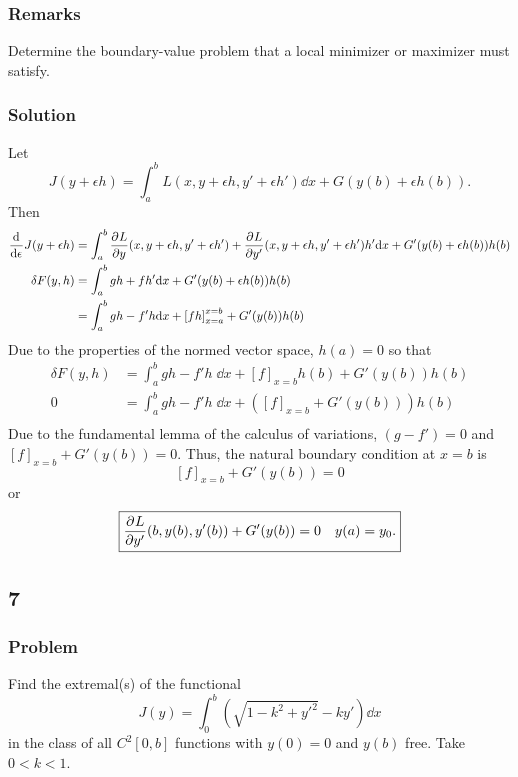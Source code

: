 \documentclass[12pt,twoside]{article}
\begin{document}
\subsubsection*{Remarks}
Determine the boundary-value problem that a local minimizer or maximizer must
satisfy.
\subsubsection*{Solution}
Let
\begin{equation*}
  J(y+\epsilon h) = \int_a^b L(x,y+\epsilon h, y'+\epsilon h')\dd{x} + G(y(b) + \epsilon h(b)).
\end{equation*}
Then
\begin{align*}
  \frac{\mathrm{d}^{} {}}{\mathrm{d}{\epsilon}^{}} J(y+\epsilon h) &= \int_a^b\frac{\partial^{} {L}}{\partial {y}^{}}(x,y+\epsilon h, y'+\epsilon h') +
                                    \frac{\partial^{} {L}}{\partial {y'}^{}}(x,y+\epsilon h, y'+\epsilon h')h'\mathrm{d}{x} +
                                    G'(y(b)+\epsilon h(b))h(b) \\
  \delta F(y,h) &= \int_a^b g h + f h'\mathrm{d}{x} + G'(y(b)+\epsilon h(b))h(b) \\
  &= \int_a^b gh - f'h\mathrm{d}{x} + {[fh]}_{x=a}^{x=b} + G'(y(b))h(b) \\
\end{align*}
Due to the properties of the normed vector space, $h(a)=0$ so that
\begin{align*}
  \delta F(y,h) &= \int_a^b gh - f'h\;\dd{x} + {[f]}_{x=b}h(b) + G'(y(b))h(b) \\
  0 &= \int_a^b gh - f'h\;\dd{x} + ({[f]}_{x=b} + G'(y(b)))h(b) \\
\end{align*}
Due to the fundamental lemma of the calculus of variations, $(g-f')=0$ and
${[f]}_{x=b} + G'(y(b))=0$. Thus, the natural boundary condition at $x=b$ is
\begin{equation*}
  {[f]}_{x=b} + G'(y(b))=0
\end{equation*}
or
\begin{equation*}
  \boxed{\frac{\partial^{} {L}}{\partial {y'}^{}}(b,y(b),y'(b)) + G'(y(b)) = 0 \quad y(a)=y_0.}
\end{equation*}

\subsection{7}
\subsubsection*{Problem}
Find the extremal{(s)} of the functional
\begin{equation}
  \label{eq:7-problem}
  J(y)=\int_0^b(\sqrt{1-k^2+y'^2}-ky') \dd{x}
\end{equation}
in the class of all $C^2[0,b]$ functions with $y(0)=0$ and $y(b)$ free. Take
$0<k<1$.
\end{document}
